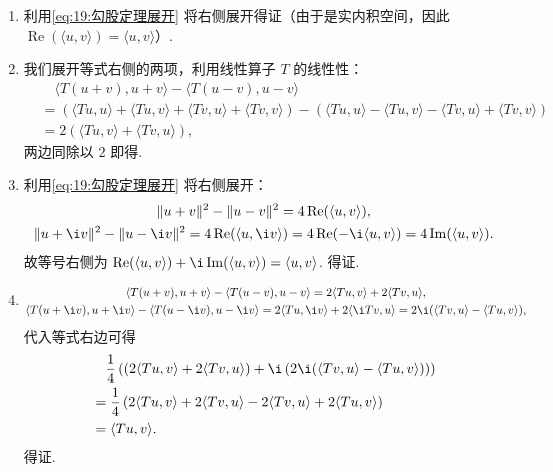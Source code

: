 \begin{solution}
    \begin{enumerate}
        \item 利用\autoref{eq:19:勾股定理展开} 将右侧展开得证（由于是实内积空间，因此 $\operatorname{Re}(\langle u, v \rangle) = \langle u, v \rangle$）.

        \item 我们展开等式右侧的两项，利用线性算子 $T$ 的线性性：
        \begin{align*}
            & \quad \langle T(u + v), u + v\rangle - \langle T(u - v), u - v\rangle \\
            & = \left(\langle Tu, u \rangle + \langle Tu, v \rangle + \langle Tv, u \rangle + \langle Tv, v \rangle\right) - \left(\langle Tu, u \rangle - \langle Tu, v \rangle - \langle Tv, u \rangle + \langle Tv, v \rangle\right) \\
            & = 2 (\langle Tu, v \rangle + \langle Tv, u \rangle),
        \end{align*}
        两边同除以 $2$ 即得.

        \item 利用\autoref{eq:19:勾股定理展开} 将右侧展开：
        \begin{gather*}
            \lVert u + v \rVert^2 - \lVert u - v \rVert^2 = 4 \operatorname{Re}(\langle u, v \rangle), \\
            \lVert u + \i v \rVert^2 - \lVert u - \i v \rVert^2 = 4 \operatorname{Re}(\langle u, \i v \rangle) = 4 \operatorname{Re}(-\i \langle u, v \rangle) = 4 \operatorname{Im}(\langle u, v \rangle).
        \end{gather*}
        故等号右侧为 $ \operatorname{Re}(\langle u, v \rangle) + \i \operatorname{Im}(\langle u, v \rangle) = \langle u, v \rangle$. 得证.

        \item
        \begin{gather*}
            \langle T(u + v), u + v\rangle - \langle T(u - v), u - v\rangle = 2\langle Tu, v \rangle + 2\langle Tv, u \rangle,\\
            \langle T(u + \i v), u + \i v\rangle - \langle T(u - \i v), u - \i v\rangle = 2\langle Tu, \i v \rangle + 2\langle \i Tv, u \rangle = 2\i (\langle Tv, u \rangle - \langle Tu, v \rangle),
        \end{gather*}
        代入等式右边可得
        \begin{align*}
            &\quad \frac{1}{4}\left(\left(2\langle Tu, v \rangle + 2\langle Tv, u \rangle\right) + \i \left(2\i (\langle Tv, u \rangle - \langle Tu, v \rangle)\right)\right) \\
            & = \frac{1}{4}\left(2\langle Tu, v \rangle + 2\langle Tv, u \rangle - 2\langle Tv, u \rangle + 2\langle Tu, v \rangle\right) \\
            & = \langle Tu, v \rangle.
        \end{align*}
        得证.
    \end{enumerate}
\end{solution}

